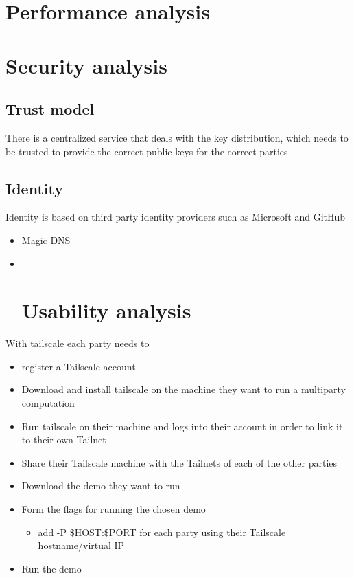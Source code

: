 \hypertarget{performance-analysis}{%
\section{Performance analysis}\label{performance-analysis}}

\hypertarget{security-analysis}{%
\section{Security analysis}\label{security-analysis}}

\hypertarget{trust-model}{%
\subsection{Trust model}\label{trust-model}}

There is a centralized service that deals with the key distribution,
which needs to be trusted to provide the correct public keys for the
correct parties

\hypertarget{identity}{%
\subsection{Identity}\label{identity}}

Identity is based on third party identity providers such as Microsoft
and GitHub

\begin{itemize}
\item
  Magic DNS
\item ~
  \hypertarget{usability-analysis}{%
  \section{Usability analysis}\label{usability-analysis}}
\end{itemize}

With tailscale each party needs to

\begin{itemize}
\tightlist
\item
  register a Tailscale account
\item
  Download and install tailscale on the machine they want to run a
  multiparty computation
\item
  Run tailscale on their machine and logs into their account in order to
  link it to their own Tailnet
\item
  Share their Tailscale machine with the Tailnets of each of the other
  parties
\item
  Download the demo they want to run
\item
  Form the flags for running the chosen demo

  \begin{itemize}
  \tightlist
  \item
    add -P \$HOST:\$PORT for each party using their Tailscale
    hostname/virtual IP
  \end{itemize}
\item
  Run the demo
\end{itemize}

